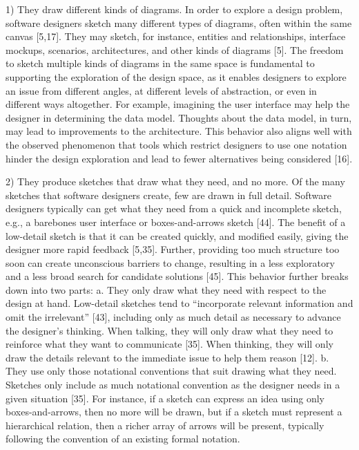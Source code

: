 1)	They draw different kinds of diagrams. In order to explore a design problem, software designers sketch many different types of diagrams, often within the same canvas [5,17]. They may sketch, for instance, entities and relationships, interface mockups, scenarios, architectures, and other kinds of diagrams [5]. The freedom to sketch multiple kinds of diagrams in the same space is fundamental to supporting the exploration of the design space, as it enables designers to explore an issue from different angles, at different levels of abstraction, or even in different ways altogether. For example, imagining the user interface may help the designer in determining the data model. Thoughts about the data model, in turn, may lead to improvements to the architecture. This behavior also aligns well with the observed phenomenon that tools which restrict designers to use one notation hinder the design exploration and lead to fewer alternatives being considered [16]. 

2)	They produce sketches that draw what they need, and no more. Of the many sketches that software designers create, few are drawn in full detail. Software designers typically can get what they need from a quick and incomplete sketch, e.g., a barebones user interface or boxes-and-arrows sketch [44]. The benefit of a low-detail sketch is that it can be created quickly, and modified easily, giving the designer more rapid feedback [5,35]. Further, providing too much structure too soon can create unconscious barriers to change, resulting in a less exploratory and a less broad search for candidate solutions [45]. This behavior further breaks down into two parts:
a.	They only draw what they need with respect to the design at hand. Low-detail sketches tend to “incorporate relevant information and omit the irrelevant” [43], including only as much detail as necessary to advance the designer’s thinking. When talking, they will only draw what they need to reinforce what they want to communicate [35]. When thinking, they will only draw the details relevant to the immediate issue to help them reason [12].
b.	They use only those notational conventions that suit drawing what they need. Sketches only include as much notational convention as the designer needs in a given situation [35]. For instance, if a sketch can express an idea using only boxes-and-arrows, then no more will be drawn, but if a sketch must represent a hierarchical relation, then a richer array of arrows will be present, typically following the convention of an existing formal notation.

